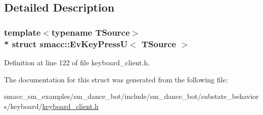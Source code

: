 \subsection{Detailed Description}
\subsubsection*{template$<$typename T\+Source$>$\\*
struct smacc\+::\+Ev\+Key\+Press\+U$<$ T\+Source $>$}



Definition at line 122 of file keyboard\+\_\+client.\+h.



The documentation for this struct was generated from the following file\+:\begin{DoxyCompactItemize}
\item 
smacc\+\_\+sm\+\_\+examples/sm\+\_\+dance\+\_\+bot/include/sm\+\_\+dance\+\_\+bot/substate\+\_\+behaviors/keyboard/\hyperlink{keyboard__client_8h}{keyboard\+\_\+client.\+h}\end{DoxyCompactItemize}
